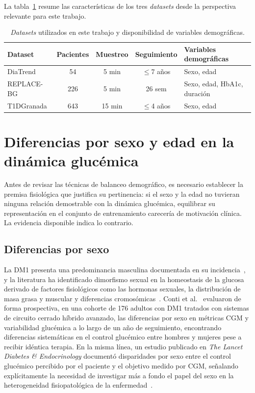 La tabla~\ref{tab:datasets_comparacion_demografico} resume las características de los tres \emph{datasets} desde la perspectiva relevante para este trabajo.

\begin{table}[htbp]
\centering
\caption{\emph{Datasets} utilizados en este trabajo y disponibilidad de variables demográficas.}
\label{tab:datasets_comparacion_demografico}
\begin{tabular}{lcccl}
\hline
\textbf{Dataset} & \textbf{Pacientes} & \textbf{Muestreo} & \textbf{Seguimiento} & \textbf{Variables demográficas} \\
\hline
DiaTrend & 54 & 5 min & $\leq$7 años & Sexo, edad \\
REPLACE-BG & 226 & 5 min & 26 sem & Sexo, edad, HbA1c, duración \\
T1DGranada & 643 & 15 min & $\leq$4 años & Sexo, edad \\
\hline
\end{tabular}
\end{table}

\section{Diferencias por sexo y edad en la dinámica glucémica}
\label{sec:diferencias_fisiologicas_sexo_edad}

Antes de revisar las técnicas de balanceo demográfico, es necesario establecer la premisa fisiológica que justifica su pertinencia: si el sexo y la edad no tuvieran ninguna relación demostrable con la dinámica glucémica, equilibrar su representación en el conjunto de entrenamiento carecería de motivación clínica. La evidencia disponible indica lo contrario.

\subsection{Diferencias por sexo}
\label{subsec:diferencias_sexo}

La DM1 presenta una predominancia masculina documentada en su incidencia~\cite{divers2020prevalence}, y la literatura ha identificado dimorfismo sexual en la homeostasis de la glucosa derivado de factores fisiológicos como las hormonas sexuales, la distribución de masa grasa y muscular y diferencias cromosómicas~\cite{mauvaisjarvis2023sexdiff}. Conti et al.~\cite{conti2025sexcgm} evaluaron de forma prospectiva, en una cohorte de 176 adultos con DM1 tratados con sistemas de circuito cerrado híbrido avanzado, las diferencias por sexo en métricas CGM y variabilidad glucémica a lo largo de un año de seguimiento, encontrando diferencias sistemáticas en el control glucémico entre hombres y mujeres pese a recibir idéntica terapia. En la misma línea, un estudio publicado en \emph{The Lancet Diabetes \& Endocrinology} documentó disparidades por sexo entre el control glucémico percibido por el paciente y el objetivo medido por CGM, señalando explícitamente la necesidad de investigar más a fondo el papel del sexo en la heterogeneidad fisiopatológica de la enfermedad~\cite{vanderheijden2025sexdisparity}.

